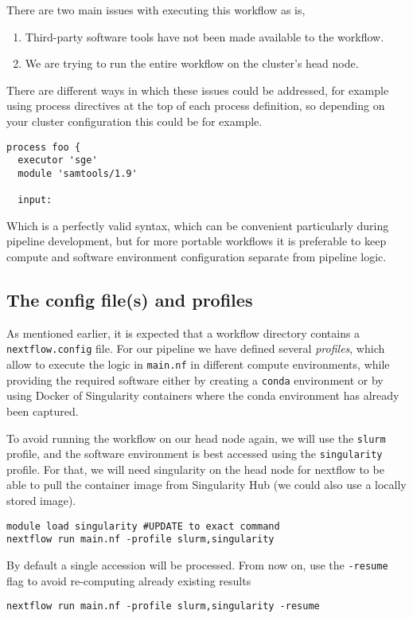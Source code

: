 There are two main issues with executing this workflow as is, 
\begin{enumerate}
 \item Third-party software tools have not been made available to the workflow.
 \item We are trying to run the entire workflow on the cluster's head node.
\end{enumerate}

There are different ways in which these issues could be addressed, for example using process 
directives at the top of each process definition, so depending on your cluster configuration this 
could be for example.
\begin{lstlisting}
process foo {
  executor 'sge' 
  module 'samtools/1.9'

  input: 
\end{lstlisting}

Which is a perfectly valid syntax, which can be convenient particularly during pipeline development, but for more portable workflows it is preferable to keep compute and software environment configuration separate from pipeline logic.  

\subsection{The config file(s) and profiles}

As mentioned earlier, it is expected that a workflow directory contains a \texttt{nextflow.config} file. 
For our pipeline we have defined several \emph{profiles}, which allow to execute the logic in \texttt{main.nf} in different compute environments, while providing the required software either by creating a \texttt{conda} environment or by using Docker of Singularity containers where the conda environment has already been captured. 
 

\begin{steps}
To avoid running the workflow on our head node again, we will use the \texttt{slurm} profile, and the software environment is best accessed using the \texttt{singularity} profile. For that, we will need singularity on the head node for nextflow to be able to pull the container image from Singularity Hub (we could also use a locally stored image). 
\begin{lstlisting}
module load singularity #UPDATE to exact command
nextflow run main.nf -profile slurm,singularity
\end{lstlisting}
By default a single accession will be processed. 
From now on, use the \texttt{-resume} flag to avoid re-computing already existing results
\begin{lstlisting}
nextflow run main.nf -profile slurm,singularity -resume
\end{lstlisting}
\end{steps}

